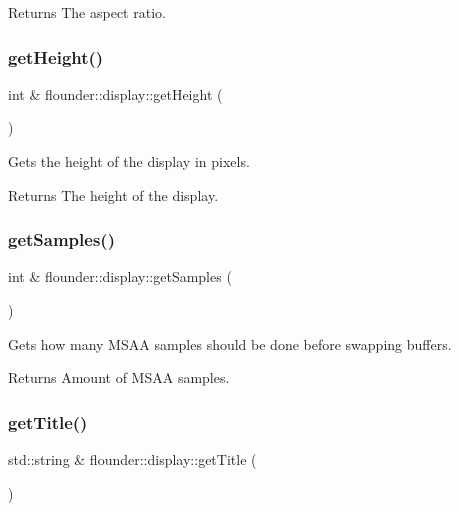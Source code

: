 \begin{DoxyReturn}{Returns}
The aspect ratio. 
\end{DoxyReturn}
\mbox{\label{classflounder_1_1display_a2b3cea6e41121de9d790acf027036167}} 
\subsubsection{\texorpdfstring{get\+Height()}{getHeight()}}
{\footnotesize\ttfamily int \& flounder\+::display\+::get\+Height (\begin{DoxyParamCaption}{ }\end{DoxyParamCaption})}



Gets the height of the display in pixels. 

\begin{DoxyReturn}{Returns}
The height of the display. 
\end{DoxyReturn}
\mbox{\label{classflounder_1_1display_ab498a060b8f23e54be9116f452a8b92a}} 
\subsubsection{\texorpdfstring{get\+Samples()}{getSamples()}}
{\footnotesize\ttfamily int \& flounder\+::display\+::get\+Samples (\begin{DoxyParamCaption}{ }\end{DoxyParamCaption})}



Gets how many M\+S\+AA samples should be done before swapping buffers. 

\begin{DoxyReturn}{Returns}
Amount of M\+S\+AA samples. 
\end{DoxyReturn}
\mbox{\label{classflounder_1_1display_ad5fc46c79d236783ac883878ec065f36}} 
\subsubsection{\texorpdfstring{get\+Title()}{getTitle()}}
{\footnotesize\ttfamily std\+::string \& flounder\+::display\+::get\+Title (\begin{DoxyParamCaption}{ }\end{DoxyParamCaption})}



